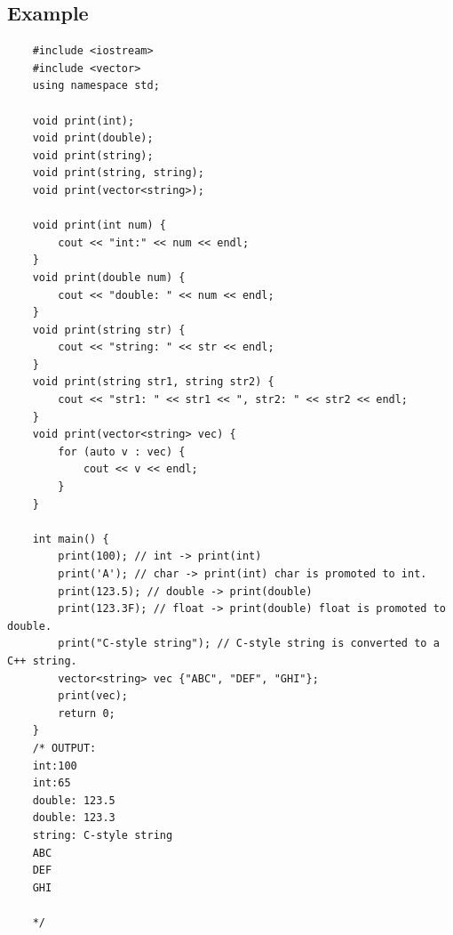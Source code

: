\subsection{Example}
\begin{verbatim}
    #include <iostream>
    #include <vector>
    using namespace std;

    void print(int);
    void print(double);
    void print(string);
    void print(string, string);
    void print(vector<string>);

    void print(int num) {
        cout << "int:" << num << endl;
    }
    void print(double num) {
        cout << "double: " << num << endl;
    }
    void print(string str) {
        cout << "string: " << str << endl;
    }
    void print(string str1, string str2) {
        cout << "str1: " << str1 << ", str2: " << str2 << endl;
    }
    void print(vector<string> vec) {
        for (auto v : vec) {
            cout << v << endl;
        }
    }

    int main() {
        print(100); // int -> print(int)
        print('A'); // char -> print(int) char is promoted to int.
        print(123.5); // double -> print(double)
        print(123.3F); // float -> print(double) float is promoted to double.
        print("C-style string"); // C-style string is converted to a C++ string.
        vector<string> vec {"ABC", "DEF", "GHI"};
        print(vec);
        return 0;
    }
    /* OUTPUT:
    int:100
    int:65
    double: 123.5
    double: 123.3
    string: C-style string
    ABC
    DEF
    GHI

    */
\end{verbatim}


